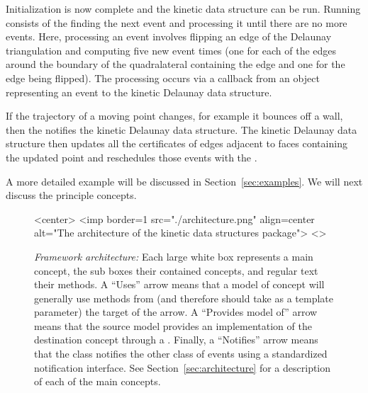 Initialization is now complete and the kinetic data structure can be
run. Running consists of the  finding the next event
and processing it until there are no more events. Here, processing an
event involves flipping an edge of the Delaunay triangulation and
computing five new event times (one for each of the edges around the
boundary of the quadralateral containing the edge and one for the edge
being flipped). The processing occurs via a callback from an object
representing an event to the kinetic Delaunay data structure.

If the trajectory of a moving point changes, for example it bounces
off a wall, then the  notifies the kinetic Delaunay data
structure. The kinetic Delaunay data structure then updates all the
certificates of edges adjacent to faces containing the updated point and
reschedules those events with the .

A more detailed example will be discussed in
Section~\ref{sec:examples}. We will next discuss the principle
concepts.

\begin{figure}[htb]
\begin{ccHtmlOnly}
<center>
<imp border=1 src="./architecture.png" align=center alt="The architecture of the kinetic data structures package">
<\center>
\end{ccHtmlOnly}
\caption{ \label{fig:architecture} 
{\em Framework architecture:} Each large white box represents a main concept, the sub boxes their
contained concepts, and regular text their methods. A ``Uses'' arrow means
that a model of concept will generally use methods from (and therefore
should take as a template parameter) the target of the arrow.  A
``Provides model of'' arrow means that the source model provides an
implementation of the destination concept through a .
Finally, a ``Notifies'' arrow means that the class notifies the other
class of events using a standardized notification interface.  See
Section~\ref{sec:architecture} for a description of each of the main
concepts. }
\end{figure}

